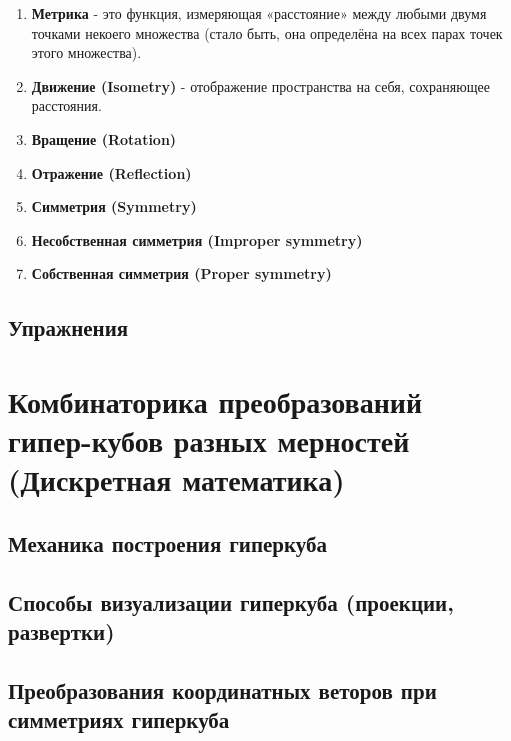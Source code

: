 \documentclass{book}
\begin{document}
\begin{enumerate}[label=\arabic*., parsep=4pt, itemsep=4pt, topsep=4pt, partopsep=0pt]

\item \textbf{Метрика} - это функция, измеряющая «расстояние» между любыми двумя точками некоего множества (стало быть, она определёна на всех парах точек этого множества).

\item \textbf{Движение (Isometry)} - отображение пространства на себя, сохраняющее расстояния.

\item \textbf{Вращение (Rotation)}

\item \textbf{Отражение (Reflection)}

\item \textbf{Симметрия (Symmetry)}

\item \textbf{Несобственная симметрия (Improper symmetry)}

\item \textbf{Собственная симметрия (Proper symmetry)}

\end{enumerate}

\section{Упражнения}

\chapter{Комбинаторика преобразований гипер-кубов разных мерностей (Дискретная математика)}

\section{Механика построения гиперкуба}

\section{Способы визуализации гиперкуба (проекции, развертки)}

\section{Преобразования координатных веторов при симметриях гиперкуба}
\end{document}

